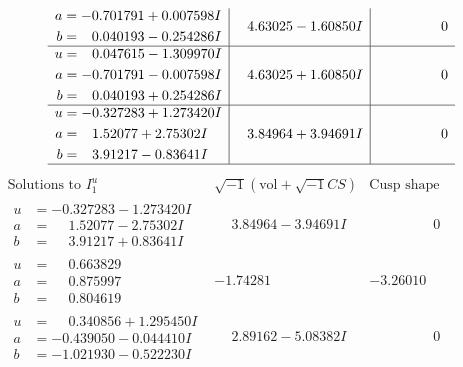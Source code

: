 \documentclass[1p]{elsarticle_modified}
\theoremstyle{definition}
\newcommand{\I}{\sqrt{-1}}
\begin{document}
$$\begin{array}{c|c|c}
\begin{aligned}
a &= -0.701791 + 0.007598 I \\
b &= \phantom{-}0.040193 - 0.254286 I\end{aligned}
 & \phantom{-}4.63025 - 1.60850 I & \phantom{-0.000000 } 0 \\ \hline\begin{aligned}
u &= \phantom{-}0.047615 - 1.309970 I \\
a &= -0.701791 - 0.007598 I \\
b &= \phantom{-}0.040193 + 0.254286 I\end{aligned}
 & \phantom{-}4.63025 + 1.60850 I & \phantom{-0.000000 } 0 \\ \hline\begin{aligned}
u &= -0.327283 + 1.273420 I \\
a &= \phantom{-}1.52077 + 2.75302 I \\
b &= \phantom{-}3.91217 - 0.83641 I\end{aligned}
 & \phantom{-}3.84964 + 3.94691 I & \phantom{-0.000000 } 0\\
 \hline 
 \end{array}$$\newpage$$\begin{array}{c|c|c}  
\text{Solutions to }I^u_{1}& \I (\text{vol} + \sqrt{-1}CS) & \text{Cusp shape}\\
 \hline 
\begin{aligned}
u &= -0.327283 - 1.273420 I \\
a &= \phantom{-}1.52077 - 2.75302 I \\
b &= \phantom{-}3.91217 + 0.83641 I\end{aligned}
 & \phantom{-}3.84964 - 3.94691 I & \phantom{-0.000000 } 0 \\ \hline\begin{aligned}
u &= \phantom{-}0.663829\phantom{ +0.000000I} \\
a &= \phantom{-}0.875997\phantom{ +0.000000I} \\
b &= \phantom{-}0.804619\phantom{ +0.000000I}\end{aligned}
 & -1.74281\phantom{ +0.000000I} & -3.26010\phantom{ +0.000000I} \\ \hline\begin{aligned}
u &= \phantom{-}0.340856 + 1.295450 I \\
a &= -0.439050 - 0.044410 I \\
b &= -1.021930 - 0.522230 I\end{aligned}
 & \phantom{-}2.89162 - 5.08382 I & \phantom{-0.000000 } 0 \\ \hline\begin{aligned}

\end{aligned}
\end{array}$$
\end{document}
